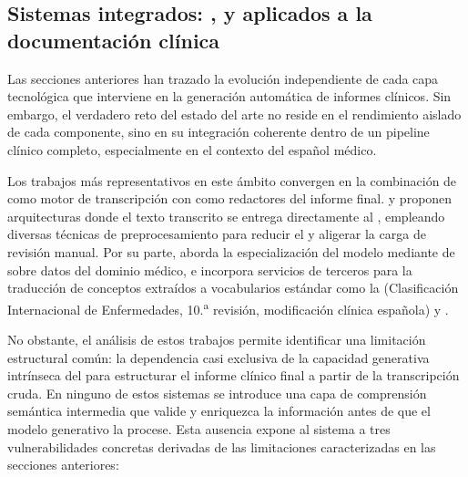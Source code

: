 \subsection{Sistemas integrados: ,  y 
aplicados a la documentación clínica}

Las secciones anteriores han trazado la evolución independiente de cada capa tecnológica 
que interviene en la generación automática de informes clínicos. Sin embargo, el verdadero 
reto del estado del arte no reside en el rendimiento aislado de cada componente, sino en 
su integración coherente dentro de un pipeline clínico completo, especialmente en el 
contexto del español médico.

Los trabajos más representativos en este ámbito convergen en la combinación de 
 como motor de transcripción con  como redactores 
del informe final.  y 
 proponen arquitecturas  
donde el texto transcrito se entrega directamente al , empleando diversas 
técnicas de preprocesamiento para reducir el  y aligerar la carga de 
revisión manual. Por su parte,  aborda la especialización del modelo 
 mediante  de  sobre datos 
del dominio médico, e incorpora servicios de terceros para la traducción de conceptos
extraídos a vocabularios estándar como la  (Clasificación Internacional de Enfermedades,
10.\textsuperscript{a} revisión, modificación clínica española) y .

No obstante, el análisis de estos trabajos permite identificar una limitación estructural 
común: la dependencia casi exclusiva de la capacidad generativa intrínseca del 
 para estructurar el informe clínico final a partir de la transcripción 
cruda. En ninguno de estos sistemas se introduce una capa de comprensión semántica 
intermedia que valide y enriquezca la información antes de que el modelo generativo la 
procese. Esta ausencia expone al sistema a tres vulnerabilidades concretas derivadas de 
las limitaciones caracterizadas en las secciones anteriores:

